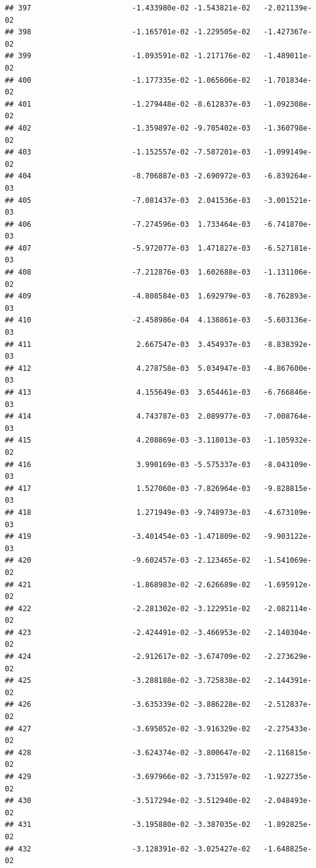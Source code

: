 \documentclass[
]{article}
\begin{document}
\begin{verbatim}
## 397                       -1.433980e-02 -1.543821e-02   -2.021139e-02
## 398                       -1.165701e-02 -1.229505e-02   -1.427367e-02
## 399                       -1.093591e-02 -1.217176e-02   -1.489011e-02
## 400                       -1.177335e-02 -1.065606e-02   -1.701834e-02
## 401                       -1.279448e-02 -8.612837e-03   -1.092308e-02
## 402                       -1.359897e-02 -9.705402e-03   -1.360798e-02
## 403                       -1.152557e-02 -7.587201e-03   -1.099149e-02
## 404                       -8.706887e-03 -2.690972e-03   -6.839264e-03
## 405                       -7.081437e-03  2.041536e-03   -3.001521e-03
## 406                       -7.274596e-03  1.733464e-03   -6.741870e-03
## 407                       -5.972077e-03  1.471827e-03   -6.527181e-03
## 408                       -7.212876e-03  1.602688e-03   -1.131106e-02
## 409                       -4.808584e-03  1.692979e-03   -8.762893e-03
## 410                       -2.458986e-04  4.138861e-03   -5.603136e-03
## 411                        2.667547e-03  3.454937e-03   -8.838392e-03
## 412                        4.278758e-03  5.034947e-03   -4.867600e-03
## 413                        4.155649e-03  3.654461e-03   -6.766846e-03
## 414                        4.743787e-03  2.089977e-03   -7.008764e-03
## 415                        4.208869e-03 -3.118013e-03   -1.105932e-02
## 416                        3.990169e-03 -5.575337e-03   -8.043109e-03
## 417                        1.527060e-03 -7.826964e-03   -9.828815e-03
## 418                        1.271949e-03 -9.748973e-03   -4.673109e-03
## 419                       -3.401454e-03 -1.471809e-02   -9.903122e-03
## 420                       -9.602457e-03 -2.123465e-02   -1.541069e-02
## 421                       -1.868983e-02 -2.626689e-02   -1.695912e-02
## 422                       -2.281302e-02 -3.122951e-02   -2.082114e-02
## 423                       -2.424491e-02 -3.466953e-02   -2.140304e-02
## 424                       -2.912617e-02 -3.674709e-02   -2.273629e-02
## 425                       -3.288188e-02 -3.725838e-02   -2.144391e-02
## 426                       -3.635339e-02 -3.886228e-02   -2.512837e-02
## 427                       -3.695052e-02 -3.916329e-02   -2.275433e-02
## 428                       -3.624374e-02 -3.800647e-02   -2.116815e-02
## 429                       -3.697966e-02 -3.731597e-02   -1.922735e-02
## 430                       -3.517294e-02 -3.512940e-02   -2.048493e-02
## 431                       -3.195880e-02 -3.387035e-02   -1.892825e-02
## 432                       -3.128391e-02 -3.025427e-02   -1.648825e-02

\end{verbatim}
\end{document}
